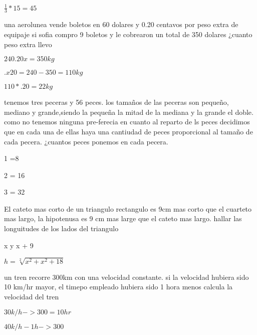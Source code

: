 \documentclass[10pt,a4paper]{book}
\begin{document}
$\frac{1}{3}*15 = 45$

una aerolunea vende boletos en 60 dolares y 0.20 centavos por peso extra de equipaje si sofia compro 9 boletos y le cobrearon un total de 350 dolares ¿cuanto peso extra llevo

$240 .20x = 350kg$

$.x20 = 240 - 350 = 110kg$

$110 * .20 =22kg$

tenemos tres peceras y 56 peces. los tamaños de las peceras son pequeño, mediano y grande,siendo la pequeña la mitad de la mediana y la grande el doble. como no tenemos ninguna pre-ferecia en cuanto al reparto de ls peces decidimos que en cada una de ellas haya una cantiudad de peces proporcional al tamaño de cada pecera. ¿cuantos peces ponemos en cada pecera.

1 =8

2 = 16

3 = 32

El cateto mas corto de un triangulo rectangulo es 9cm mas corto que el cuarteto mas largo, la hipotenusa es 9 cm mas large que el cateto mas largo. hallar las longuitudes de los lados del triangulo

x y x + 9

$h = \sqrt[2]{x^2+x^2+18}$

un tren recorre 300km con una velocidad constante. si la velocidad hubiera sido 10 km/hr mayor, el timepo empleado hubiera sido 1 hora menos calcula la velocidad del tren

$30k/h -> 300 = 10hr$

$40k/h - 1h -> 300$
\end{document}
